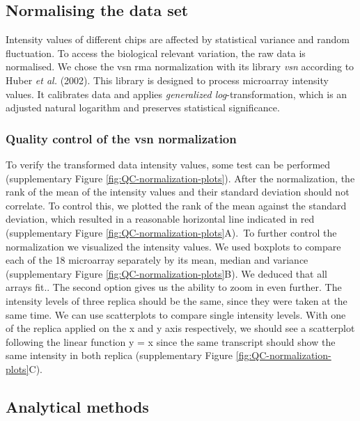 \documentclass[
]{article}
\begin{document}
\hypertarget{normalising-the-data-set}{%
\subsection{Normalising the data set}\label{normalising-the-data-set}}

Intensity values of different chips are affected by statistical variance and random fluctuation. To access the biological relevant variation, the raw data is normalised. We chose the vsn rma normalization with its library \emph{vsn} according to Huber \emph{et al.} (2002). This library is designed to process microarray intensity values. It calibrates data and applies \emph{generalized log}-transformation, which is an adjusted natural logarithm and preserves statistical significance.

\hypertarget{QC-normalization}{%
\subsubsection{Quality control of the vsn normalization}\label{QC-normalization}}

To verify the transformed data intensity values, some test can be performed (supplementary Figure \ref{fig:QC-normalization-plots}). After the normalization, the rank of the mean of the intensity values and their standard deviation should not correlate. To control this, we plotted the rank of the mean against the standard deviation, which resulted in a reasonable horizontal line indicated in red (supplementary Figure \ref{fig:QC-normalization-plots}A).~To further control the normalization we visualized the intensity values. We used boxplots to compare each of the 18 microarray separately by its mean, median and variance (supplementary Figure \ref{fig:QC-normalization-plots}B). We deduced that all arrays fit.. The second option gives us the ability to zoom in even further. The intensity levels of three replica should be the same, since they were taken at the same time. We can use scatterplots to compare single intensity levels. With one of the replica applied on the x and y axis respectively, we should see a scatterplot following the linear function y = x since the same transcript should show the same intensity in both replica (supplementary Figure \ref{fig:QC-normalization-plots}C).

\hypertarget{analytical-methods}{%
\subsection{Analytical methods}\label{analytical-methods}}
\end{document}
